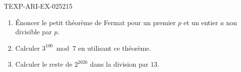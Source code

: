 \begin{exercice}{TEXP-ARI-EX-025}{2}{15}
\begin{enumerate}
  \item Énoncer le petit théorème de Fermat pour un premier $p$ et un entier
        $a$ non divisible par $p$.
  \item Calculer $3^{100}\bmod 7$ en utilisant ce théorème.
  \item Calculer le reste de $2^{2026}$ dans la division par $13$.
\end{enumerate}
\end{exercice}
